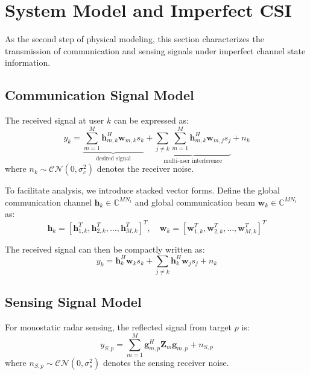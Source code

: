 \documentclass[12pt,a4paper]{article}
\newcommand{\vect}[1]{\mathbf{#1}}
\newcommand{\mat}[1]{\mathbf{#1}}
\begin{document}
\section{System Model and Imperfect CSI}

As the second step of physical modeling, this section characterizes the transmission of communication and sensing signals under imperfect channel state information.

\subsection{Communication Signal Model}

The received signal at user $k$ can be expressed as:
\begin{equation}
y_k = \underbrace{\sum_{m=1}^M \vect{h}_{m,k}^H \vect{w}_{m,k} s_k}_{\text{desired signal}} + \underbrace{\sum_{j \neq k} \sum_{m=1}^M \vect{h}_{m,k}^H \vect{w}_{m,j} s_j}_{\text{multi-user interference}} + n_k
\end{equation}
where $n_k \sim \mathcal{CN}(0, \sigma_c^2)$ denotes the receiver noise.

To facilitate analysis, we introduce stacked vector forms. Define the global communication channel $\vect{h}_k \in \mathbb{C}^{MN_t}$ and global communication beam $\vect{w}_k \in \mathbb{C}^{MN_t}$ as:
\begin{equation}
\vect{h}_k = [\vect{h}_{1,k}^T, \vect{h}_{2,k}^T, \ldots, \vect{h}_{M,k}^T]^T, \quad
\vect{w}_k = [\vect{w}_{1,k}^T, \vect{w}_{2,k}^T, \ldots, \vect{w}_{M,k}^T]^T
\end{equation}

The received signal can then be compactly written as:
\begin{equation}
y_k = \vect{h}_k^H \vect{w}_k s_k + \sum_{j \neq k} \vect{h}_k^H \vect{w}_j s_j + n_k
\end{equation}

\subsection{Sensing Signal Model}

For monostatic radar sensing, the reflected signal from target $p$ is:
\begin{equation}
y_{S,p} = \sum_{m=1}^M \vect{g}_{m,p}^H \mat{Z}_m \vect{g}_{m,p} + n_{S,p}
\end{equation}
where $n_{S,p} \sim \mathcal{CN}(0, \sigma_s^2)$ denotes the sensing receiver noise.
\end{document}
